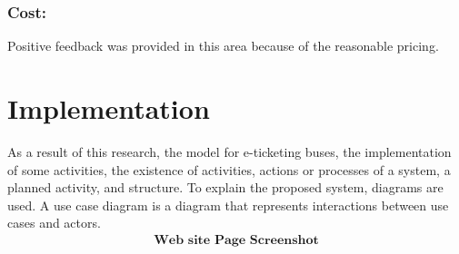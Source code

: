 \documentclass[runningheads]{llncs}
\begin{document}
\subsubsection{Cost:} Positive feedback was provided in this area because of the reasonable pricing.
\newpage
\section{Implementation}
As a result of this research, the model for e-ticketing buses, the implementation
of some activities, the existence of activities, actions or processes of a system, a
planned activity, and structure. To explain the proposed system, diagrams are
used. A use case diagram is a diagram that represents interactions between use
cases and actors.
\begin{align}
    \textbf{Web site Page Screenshot}
\end{align}
\end{document}
